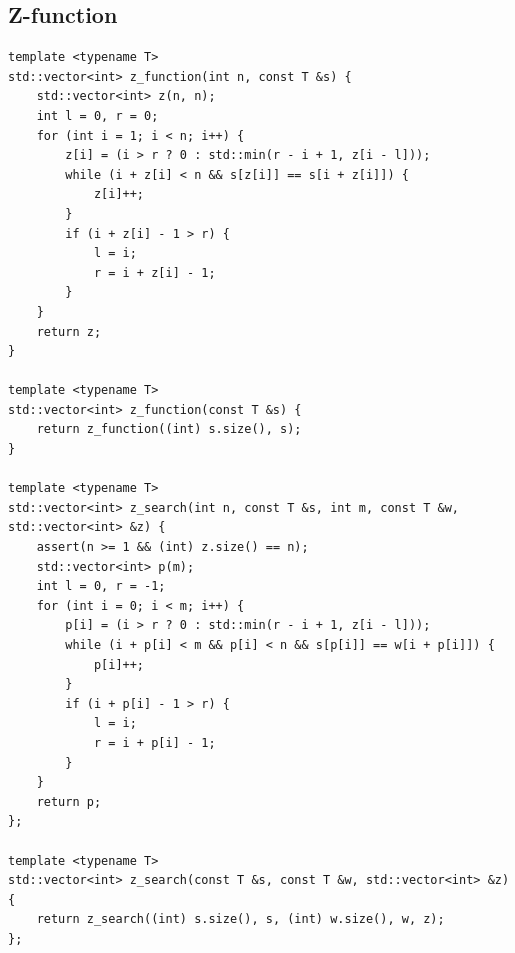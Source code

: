 \documentclass[twoside]{article}
\begin{document}
\subsection{Z-function}
\begin{lstlisting}
template <typename T>
std::vector<int> z_function(int n, const T &s) {
    std::vector<int> z(n, n);
    int l = 0, r = 0;
    for (int i = 1; i < n; i++) {
        z[i] = (i > r ? 0 : std::min(r - i + 1, z[i - l]));
        while (i + z[i] < n && s[z[i]] == s[i + z[i]]) {
            z[i]++;
        }
        if (i + z[i] - 1 > r) {
            l = i;
            r = i + z[i] - 1;
        }
    }
    return z;
}
 
template <typename T>
std::vector<int> z_function(const T &s) {
    return z_function((int) s.size(), s);
}

template <typename T>
std::vector<int> z_search(int n, const T &s, int m, const T &w, std::vector<int> &z) {
    assert(n >= 1 && (int) z.size() == n);
    std::vector<int> p(m);
    int l = 0, r = -1;
    for (int i = 0; i < m; i++) {
        p[i] = (i > r ? 0 : std::min(r - i + 1, z[i - l]));
        while (i + p[i] < m && p[i] < n && s[p[i]] == w[i + p[i]]) {
            p[i]++;
        }
        if (i + p[i] - 1 > r) {
            l = i;
            r = i + p[i] - 1;
        }
    }
    return p;
};

template <typename T>
std::vector<int> z_search(const T &s, const T &w, std::vector<int> &z) {
    return z_search((int) s.size(), s, (int) w.size(), w, z);
};
\end{lstlisting}
\end{document}
